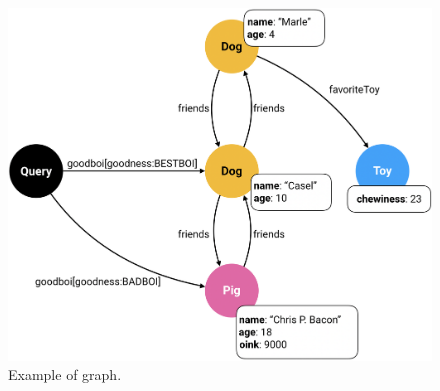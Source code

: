 
\begin{figure}
    \centering
    \includegraphics[scale=0.33]{imgs/graph.png}
    \caption{Example of \gql graph.}
    \label{fig:graph_ex}
\end{figure}




